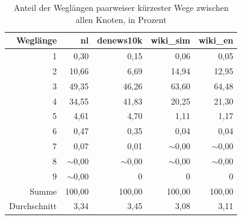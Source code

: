 \documentclass[11pt, a4paper]{article}
\begin{document}
\begin{table}[ht]
    \centering
    \begin{tabular}{rrrrr}
      \toprule
    Weglänge       & nl          & denews10k   & wiki\_sim   & wiki\_en     \\ 
      \midrule
      1            & 0,30        & 0,15        & 0,06        & 0,05         \\ 
      2            & 10,66       & 6,69        & 14,94       & 12,95        \\ 
      3            & 49,35       & 46,26       & 63,60       & 64,48        \\ 
      4            & 34,55       & 41,83       & 20,25       & 21,30        \\ 
      5            & 4,61        & 4,70        & 1,11        & 1,17         \\ 
      6            & 0,47        & 0,35        & 0,04        & 0,04         \\ 
      7            & 0,07        & 0,01        & $\sim$0,00  & $\sim$0,00   \\ 
      8            & $\sim$0,00  & $\sim$0,00  & $\sim$0,00  & $\sim$0,00   \\ 
      9            & $\sim$0,00  & 0           & 0           & 0            \\ 
      Summe        & 100,00      & 100,00      & 100,00      & 100,00       \\ 
      Durchschnitt & 3,34        & 3,45        & 3,08        & 3,11         \\
       \bottomrule
    \end{tabular}
    \caption{Anteil der Weglängen paarweiser kürzester Wege zwischen allen Knoten, in Prozent}
    \label{md-perc}
\end{table}
\end{document}
